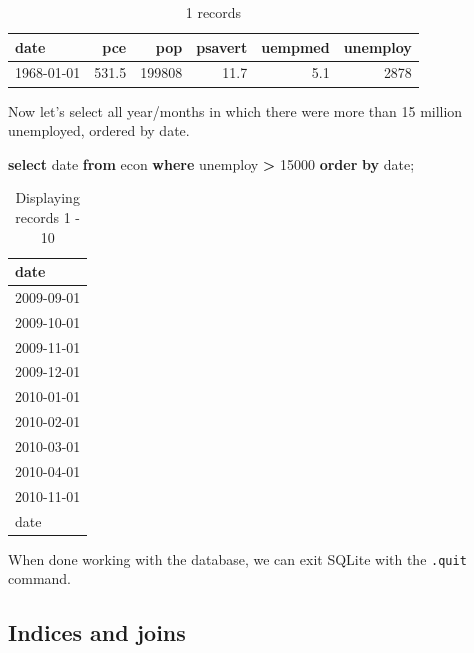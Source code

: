 \documentclass[
  12pt,
]{style/krantz}
\newenvironment{Shaded}{\begin{snugshade}}{\end{snugshade}}
\newcommand{\DataTypeTok}[1]{\textcolor[rgb]{0.13,0.29,0.53}{#1}}
\newcommand{\DecValTok}[1]{\textcolor[rgb]{0.00,0.00,0.81}{#1}}
\newcommand{\KeywordTok}[1]{\textcolor[rgb]{0.13,0.29,0.53}{\textbf{#1}}}
\newcommand{\NormalTok}[1]{#1}
\newcommand{\OperatorTok}[1]{\textcolor[rgb]{0.81,0.36,0.00}{\textbf{#1}}}
\begin{document}
\begin{table}

\caption{\label{tab:unnamed-chunk-109}1 records}
\centering
\begin{tabular}[t]{l|r|r|r|r|r}
\hline
date & pce & pop & psavert & uempmed & unemploy\\
\hline
1968-01-01 & 531.5 & 199808 & 11.7 & 5.1 & 2878\\
\hline
\end{tabular}
\end{table}

Now let's select all year/months in which there were more than 15 million unemployed, ordered by date.

\begin{Shaded}
\begin{Highlighting}[]
\KeywordTok{select} \DataTypeTok{date} \KeywordTok{from}\NormalTok{ econ }
\KeywordTok{where}\NormalTok{ unemploy }\OperatorTok{\textgreater{}} \DecValTok{15000}
\KeywordTok{order} \KeywordTok{by} \DataTypeTok{date}\NormalTok{;}
\end{Highlighting}
\end{Shaded}

\begin{table}

\caption{\label{tab:unnamed-chunk-110}Displaying records 1 - 10}
\centering
\begin{tabular}[t]{l}
\hline
date\\
\hline
2009-09-01\\
\hline
2009-10-01\\
\hline
2009-11-01\\
\hline
2009-12-01\\
\hline
2010-01-01\\
\hline
2010-02-01\\
\hline
2010-03-01\\
\hline
2010-04-01\\
\hline
2010-11-01\\
\hline
date\\
\hline
\end{tabular}
\end{table}

When done working with the database, we can exit SQLite with the \texttt{.quit} command.

\hypertarget{indices-and-joins}{%
\subsection{Indices and joins}\label{indices-and-joins}}
\end{document}
